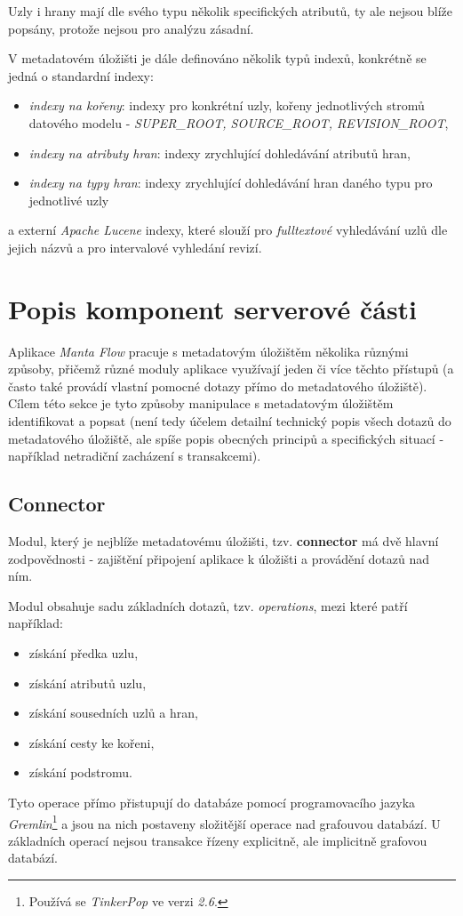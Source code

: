 Uzly i hrany mají dle svého typu několik specifických atributů, ty ale nejsou blíže popsány, protože nejsou pro analýzu zásadní.

V metadatovém úložišti je dále definováno několik typů indexů, konkrétně se jedná o standardní indexy:

\begin{itemize}
	\item{\textit{indexy na kořeny}}: indexy pro konkrétní uzly, kořeny jednotlivých stromů datového modelu - \textit{SUPER\_ROOT, SOURCE\_ROOT, REVISION\_ROOT},
	\item{\textit{indexy na atributy hran}}: indexy zrychlující dohledávání atributů hran,
	\item{\textit{indexy na typy hran}}: indexy zrychlující dohledávání hran daného typu pro jednotlivé uzly
\end{itemize}

a externí \textit{Apache Lucene} indexy, které slouží pro \textit{fulltextové} vyhledávání uzlů dle jejich názvů a pro intervalové vyhledání revizí.


\section{Popis komponent serverové části}
\label{sec:ana_components}

Aplikace \textit{Manta Flow} pracuje s metadatovým úložištěm několika různými způsoby, přičemž různé moduly aplikace využívají jeden či více těchto přístupů (a často také provádí vlastní pomocné dotazy přímo do metadatového úložiště). Cílem této sekce je tyto způsoby manipulace s metadatovým úložištěm identifikovat a popsat (není tedy účelem detailní technický popis všech dotazů do metadatového úložiště, ale spíše popis obecných principů a specifických situací - například netradiční zacházení s transakcemi).

\subsection{Connector}
\label{sec:ana_connector}
Modul, který je nejblíže metadatovému úložišti, tzv. \textbf{connector} má dvě hlavní zodpovědnosti - zajištění připojení aplikace k úložišti a provádění dotazů nad ním.

Modul obsahuje sadu základních dotazů, tzv. \textit{operations}, mezi které patří například:
\begin{itemize}
	\item{získání předka uzlu},
	\item{získání atributů uzlu},
	\item{získání sousedních uzlů a hran},
	\item{získání cesty ke kořeni},
	\item{získání podstromu}.
\end{itemize}
Tyto operace přímo přistupují do databáze pomocí programovacího jazyka \textit{Gremlin}\footnote{Používá se \textit{TinkerPop} ve verzi \textit{2.6}.} a jsou na nich postaveny složitější operace nad grafouvou databází. U základních operací nejsou transakce řízeny explicitně, ale implicitně grafovou databází.

